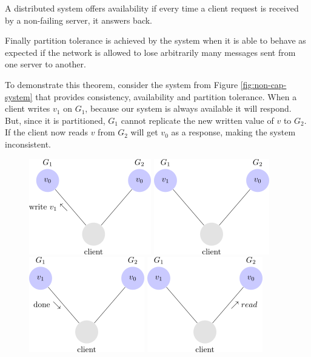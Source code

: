 A distributed system offers availability if every time a client request is received by a non-failing server, it answers back.

Finally partition tolerance is achieved by the system when it is able to behave as expected if the network is allowed to lose arbitrarily many messages sent from one server to another.

To demonstrate this theorem, consider the system from Figure \ref{fig:non-cap-system} that provides consistency, availability and partition tolerance. When a client writes $v_{1}$ on $G_{1}$, because our system is always available it will respond. But, since it is partitioned, $G_{1}$ cannot replicate the new written value of $v$ to $G_{2}$. If the client now reads $v$ from $G_{2}$ will get $v_{0}$ as a response, making the system inconsistent.
\begin{figure}[h!]
\centering
    \includegraphics[scale=0.6]{assets/images/cap22.png}
    \includegraphics[scale=0.6]{assets/images/cap23.png}
    \includegraphics[scale=0.6]{assets/images/cap24.png}
    \includegraphics[scale=0.6]{assets/images/cap25.png}

\end{figure}
